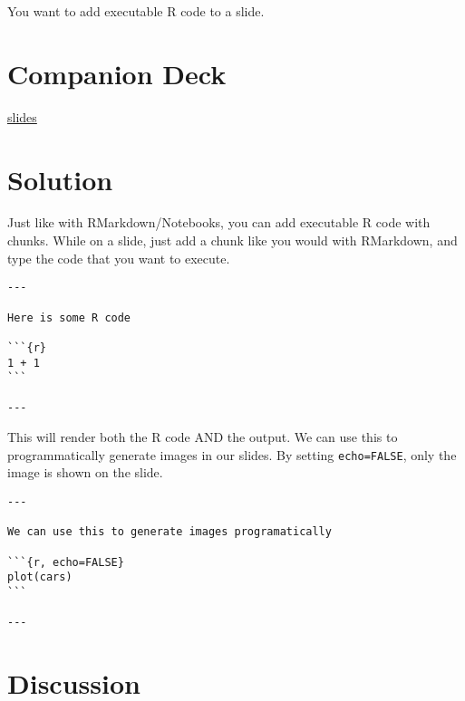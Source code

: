 \documentclass[]{book}
\theoremstyle{definition}
\theoremstyle{definition}
\theoremstyle{definition}
\theoremstyle{remark}
\begin{document}
You want to add executable R code to a slide.

\hypertarget{companion-deck-3}{%
\section{Companion Deck}\label{companion-deck-3}}

\href{http://xaringan-field-guide-companion.davisvaughan.com/04-r-chunk/r-chunk.html\#1}{slides}

\hypertarget{solution-3}{%
\section{Solution}\label{solution-3}}

Just like with RMarkdown/Notebooks, you can add executable R code with
chunks. While on a slide, just add a chunk like you would with
RMarkdown, and type the code that you want to execute.

\begin{verbatim}
---

Here is some R code

```{r}
1 + 1
```

---
\end{verbatim}

This will render both the R code AND the output. We can use this to
programmatically generate images in our slides. By setting
\texttt{echo=FALSE}, only the image is shown on the slide.

\begin{verbatim}
---

We can use this to generate images programatically

```{r, echo=FALSE}
plot(cars)
```

---
\end{verbatim}

\hypertarget{discussion-3}{%
\section{Discussion}\label{discussion-3}}


\end{document}
